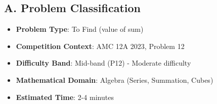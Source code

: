 \documentclass[12pt]{article}
\begin{document}
\begin{problemconfigbox}
\subsection*{A. Problem Classification}
\begin{itemize}[leftmargin=*]
    \item \textbf{Problem Type}: To Find (value of sum)
    \item \textbf{Competition Context}: AMC 12A 2023, Problem 12
    \item \textbf{Difficulty Band}: Mid-band (P12) - Moderate difficulty
    \item \textbf{Mathematical Domain}: Algebra (Series, Summation, Cubes)
    \item \textbf{Estimated Time}: 2-4 minutes
\end{itemize}


\end{problemconfigbox}
\end{document}
